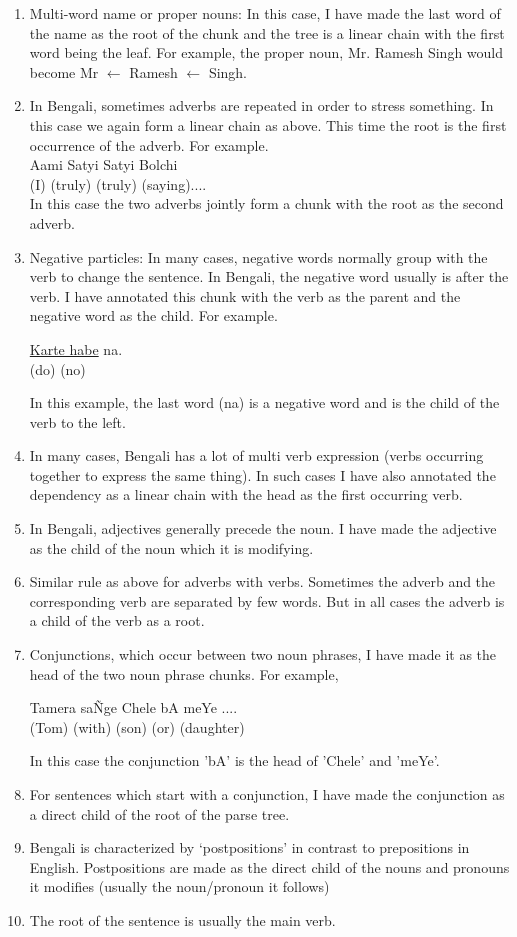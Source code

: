 \documentclass[11pt,letterpaper]{article}
\begin{document}
\begin{enumerate}
\item Multi-word name or proper nouns: In this case, I have made the last word of the name as the root of the chunk and the tree is a linear chain with the first word being the leaf. For example, the proper noun, Mr. Ramesh Singh would become Mr $\leftarrow$ Ramesh $\leftarrow$ Singh.
\item In Bengali, sometimes adverbs are repeated in order to stress something. In this case we again form a linear chain as above. This time the root is the first occurrence of the adverb. For example. \\
Aami Satyi Satyi Bolchi\\
(I)       (truly) (truly) (saying)....\\
In this case the two adverbs jointly form a chunk with the root as the second adverb.
\item Negative particles: In many cases, negative words normally group with the verb to change the sentence. In Bengali, the negative word usually is after the verb. I have annotated this chunk with the verb as the parent and the negative word as the child. For example. \\
\begin{center}
\underline{Karte habe} na.\\
(do)					(no)

\end{center}
 In this example, the last word (na) is a negative word and is the child of the verb to the left. 
\item In many cases, Bengali has a lot of multi verb expression (verbs occurring together to express the same thing). In such cases I have also annotated the dependency as a linear chain with the head as the first occurring verb. 
\item In Bengali, adjectives generally precede the noun. I have made the adjective as the child of the noun which it is modifying. 
\item Similar rule as above for adverbs with verbs. Sometimes the adverb and the corresponding verb are separated by few words. But in all cases the adverb is a child of the verb as a root.
\item Conjunctions, which occur between two noun phrases, I have made it as the head of the two noun phrase chunks. For example, \\
\begin{center}
Tamera sa\~ Nge Chele bA meYe ....\\
(Tom)     (with)    (son)  (or) (daughter)
\end{center}
In this case the conjunction 'bA' is the head of 'Chele' and 'meYe'. 
\item For sentences which start with a conjunction, I have made the conjunction as a direct child of the root of the parse tree.
\item Bengali is characterized by `postpositions' in contrast to prepositions in English. Postpositions are made as the direct child of the nouns and pronouns it modifies (usually the noun/pronoun it follows)
\item The root of the sentence is usually the main verb. 
\end{enumerate}
\end{document}
